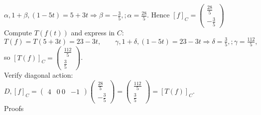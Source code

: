 \documentclass{article}
\begin{document}
\begin{multicols*}{2}
$\alpha,1+\beta,(1-5t)=5+3t \Longrightarrow \beta=-\tfrac35,;\alpha=\tfrac{28}{5}.$
Hence $[f]_C=\begin{pmatrix}\tfrac{28}{5}\\-\tfrac35\end{pmatrix}$
\\Compute $T(f(t))$ and express in $C$:
\\$T(f)=T(5+3t)=23-3t,\qquad \gamma,1+\delta,(1-5t)=23-3t \Longrightarrow \delta=\tfrac35,;\gamma=\tfrac{112}{5},$
\\so $[T(f)]_C=\begin{pmatrix}\tfrac{112}{5}\\\tfrac35\end{pmatrix}$.
\\Verify diagonal action:
$D,[f]_C=\begin{pmatrix}4 & 0\ 0 & -1\end{pmatrix} \begin{pmatrix}\tfrac{28}{5}\\-\tfrac35\end{pmatrix}=\begin{pmatrix}\tfrac{112}{5}\\[4pt]\tfrac35\end{pmatrix} =[T(f)]_C.$
\\ \Large Proofs

\end{multicols*}
\end{document}
